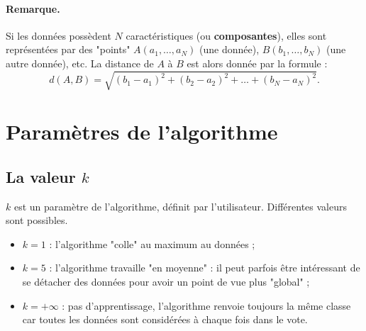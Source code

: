 \documentclass[12pt]{article}                   %
\theoremstyle{exercicestyle}
\theoremstyle{break2}
\theoremstyle{break3}
\begin{document}
\paragraph{Remarque.} Si les données possèdent $N$ caractéristiques (ou \textbf{composantes}), elles sont représentées par des "points" $A(a_1, \ldots, a_N)$ (une donnée), $B(b_1, \ldots, b_N)$ (une autre donnée), etc. La distance de $A$ à $B$ est alors donnée par la formule :
$$ 
d(A, B) = \sqrt{(b_1 - a_1)^2 + (b_2 - a_2)^2 + \ldots + (b_N - a_N)^2}.
$$

\section{Paramètres de l'algorithme}

\subsection{La valeur $k$}

$k$ est un paramètre de l'algorithme, définit par l'utilisateur. Différentes valeurs sont possibles.
\begin{itemize}[label=\textbullet]
    \item $k = 1$ : l'algorithme "colle" au maximum au données ;
    \item $k = 5$ : l'algorithme travaille "en moyenne" : il peut parfois être intéressant de se détacher des données pour avoir un point de vue plus "global" ;
    \item $k = +\infty $ : pas d'apprentissage, l'algorithme renvoie toujours la même classe car toutes les données sont considérées à chaque fois dans le vote.
\end{itemize}
\end{document}
